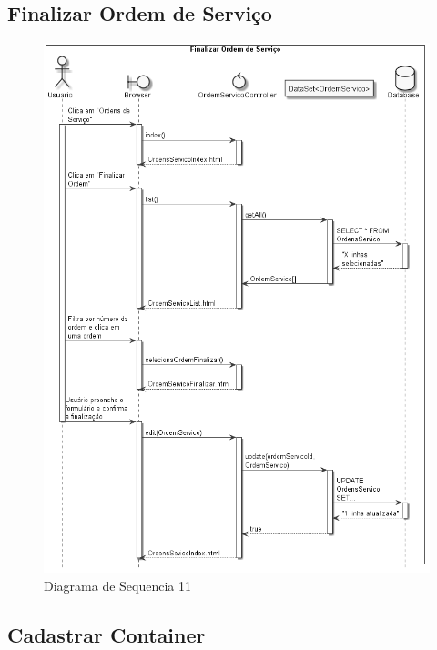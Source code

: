 \documentclass[rascunho,xindy,acronym,symbols]{fei}
\begin{document}
\subsection{Finalizar Ordem de Serviço}

\begin{figure}[H]
    \centering
    \includegraphics[width=\textwidth]{./Images/DS_Finalizar_Ordem_Servico.jpg}
    \caption{Diagrama de Sequencia 11}
    \label{fig:diag_seq11}
\end{figure}

\subsection{Cadastrar Container}
\end{document}
